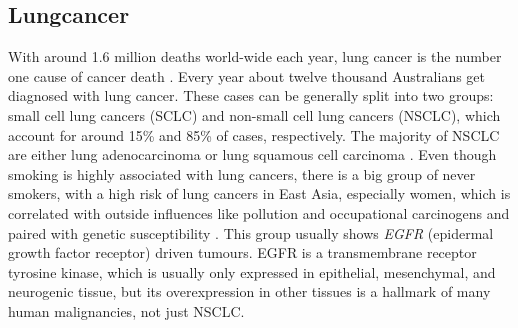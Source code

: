 \subsection{Lungcancer}
\label{intro-sec:lungcancer}

With around 1.6 million deaths world-wide each year, lung cancer is the number one cause of cancer death \cite{Siegel2018}. Every year about twelve thousand Australians get diagnosed with lung cancer. These cases can be generally split into two groups: small cell lung cancers (SCLC) and non-small cell lung cancers (NSCLC), which account for around 15\% and 85\% of cases, respectively. The majority of NSCLC are either lung adenocarcinoma or lung squamous cell carcinoma \cite{Molina2008}. Even though smoking is highly associated with lung cancers, there is a big group of never smokers, with a high risk of lung cancers in East Asia, especially women, which is correlated with outside influences like pollution and occupational carcinogens and paired with genetic susceptibility \cite{Sun2007}.
This group usually shows \textit{EGFR} (epidermal growth factor receptor) driven tumours. EGFR is a transmembrane receptor tyrosine kinase, which is usually only expressed in epithelial, mesenchymal, and neurogenic tissue, but its overexpression in other tissues is a hallmark of many human malignancies, not just NSCLC.

